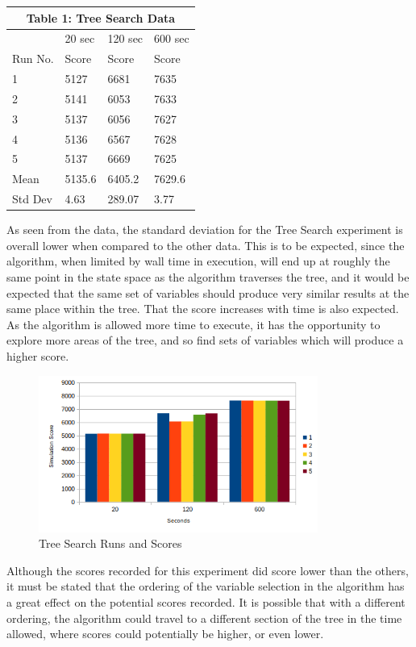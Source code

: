 \documentclass[10pt, twocolumn]{article}
\begin{document}
\bigbreak
\begin{tabular}{ |p{1.3cm}||p{1.3cm}|p{1.3cm}|p{1.3cm}|  }
 \hline
 \multicolumn{4}{|c|}{Table 1: Tree Search Data} \\
 \hline
     &20 sec&120 sec&600 sec\\
 \hline
  Run No. & Score & Score & Score\\
 \hline
   1 & 5127 & 6681 & 7635\\
   2 & 5141 & 6053 & 7633\\
   3 & 5137 & 6056 & 7627\\
   4 & 5136 & 6567 & 7628\\
   5 & 5137 & 6669 & 7625\\
 \hline
 Mean & 5135.6 & 6405.2 & 7629.6\\
 \hline
 Std Dev& 4.63 & 289.07 & 3.77\\
 \hline
\end{tabular}
\bigbreak


As seen from the data, the standard deviation for the Tree Search experiment is overall lower
when compared to the other data. This is to be expected, since the algorithm, when limited by wall time
in execution, will end up at roughly the same point in the state space as the algorithm
traverses the tree, and it would be expected that the same set of variables should produce very similar
results at the same place within the tree. That the score increases with time is also expected. As the
algorithm is allowed more time to execute, it has the opportunity to explore more areas of the tree, and so
find sets of variables which will produce a higher score.


\medskip
\begin{figure}[!ht]
\centering
\includegraphics[width=3.6in]{search_scores.png}
\caption{Tree Search Runs and Scores}
\label{fig_1}
\end{figure}
\medskip


Although the scores recorded for this experiment did score lower than the others,
it must be stated that the ordering of the variable selection in the algorithm has
a great effect on the potential scores recorded. It is possible that with a different
ordering, the algorithm could travel to a different section of the tree in the time allowed,
where scores could potentially be higher, or even lower.
\end{document}
